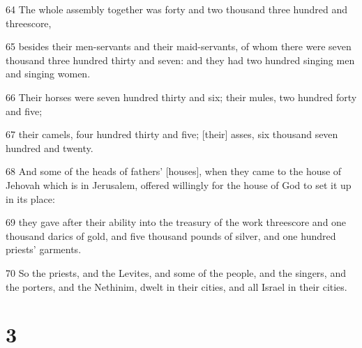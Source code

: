 \par 64 The whole assembly together was forty and two thousand three hundred and threescore,
\par 65 besides their men-servants and their maid-servants, of whom there were seven thousand three hundred thirty and seven: and they had two hundred singing men and singing women.
\par 66 Their horses were seven hundred thirty and six; their mules, two hundred forty and five;
\par 67 their camels, four hundred thirty and five; [their] asses, six thousand seven hundred and twenty.
\par 68 And some of the heads of fathers' [houses], when they came to the house of Jehovah which is in Jerusalem, offered willingly for the house of God to set it up in its place:
\par 69 they gave after their ability into the treasury of the work threescore and one thousand darics of gold, and five thousand pounds of silver, and one hundred priests' garments.
\par 70 So the priests, and the Levites, and some of the people, and the singers, and the porters, and the Nethinim, dwelt in their cities, and all Israel in their cities.

\chapter{3}

